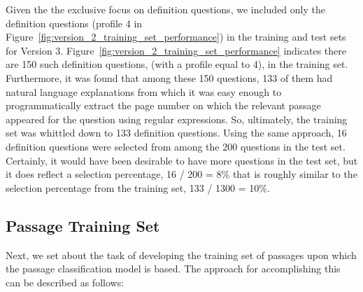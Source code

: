 
Given the the exclusive focus on definition questions, we included only the definition questions (profile 4 in Figure~\ref{fig:version_2_training_set_performance}) in the training and test sets for Version 3. Figure~\ref{fig:version_2_training_set_performance} indicates there are 150 such definition questions, (with a profile equal to 4), in the training set.  Furthermore, it was found that among these 150 questions, 133 of them had natural language explanations from which it was easy enough to programmatically extract the page number on which the relevant passage appeared for the question using regular expressions.  So, ultimately, the training set was whittled down to 133 definition questions.  Using the same approach, 16 definition questions were selected from among the 200 questions in the test set.  Certainly, it would have been desirable to have more questions in the test set, but it does reflect a selection percentage, 16 / 200 = 8\% that is roughly similar to the selection percentage from the training set, 133 / 1300 = 10\%.

\subsection{Passage Training Set}

Next, we set about the task of developing the training set of passages upon which the passage classification model is based.  The approach for accomplishing this can be described as follows:

